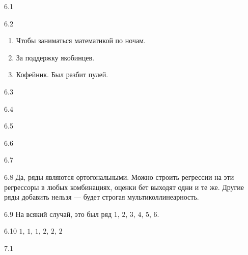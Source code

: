 \protect \hypertarget {soln:6.1}{}
\begin{solution}{{6.1}}
\end{solution}
\protect \hypertarget {soln:6.2}{}
\begin{solution}{{6.2}}
    \begin{enumerate}
      \item Чтобы заниматься математикой по ночам.
      \item За поддержку якобинцев.
      \item Кофейник. Был разбит пулей.
    \end{enumerate}
\end{solution}
\protect \hypertarget {soln:6.3}{}
\begin{solution}{{6.3}}
  
\end{solution}
\protect \hypertarget {soln:6.4}{}
\begin{solution}{{6.4}}
  
\end{solution}
\protect \hypertarget {soln:6.5}{}
\begin{solution}{{6.5}}
  
\end{solution}
\protect \hypertarget {soln:6.6}{}
\begin{solution}{{6.6}}
  
\end{solution}
\protect \hypertarget {soln:6.7}{}
\begin{solution}{{6.7}}
  
\end{solution}
\protect \hypertarget {soln:6.8}{}
\begin{solution}{{6.8}}
   Да, ряды являются ортогональными. Можно строить регрессии на эти регрессоры в любых комбинациях, оценки бет выходят одни и те же.
   Другие ряды добавить нельзя — будет строгая мультиколлинеарность.
 
\end{solution}
\protect \hypertarget {soln:6.9}{}
\begin{solution}{{6.9}}
     На всякий случай, это был ряд $1$, $2$, $3$, $4$, $5$, $6$.
   
\end{solution}
\protect \hypertarget {soln:6.10}{}
\begin{solution}{{6.10}}
   $1$, $1$, $1$, $2$, $2$, $2$
   
\end{solution}
\protect \hypertarget {soln:7.1}{}
\begin{solution}{{7.1}}
\end{solution}
